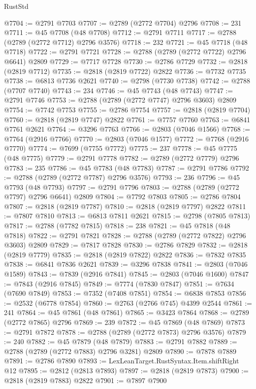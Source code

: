 \begin{lexlean}{RustStd}
\begin{coremodule}
@7704 := @2791 @7703
@7707 := @2789 (@2772 @7704) @2796
@7708 := 231
@7711 := @45 @7708 (@48 @7708)
@7712 := @2791 @7711
@7717 := @2788 (@2789 (@2772 @7712) @2796 @3576)
@7718 := 232
@7721 := @45 @7718 (@48 @7718)
@7722 := @2791 @7721
@7728 := @2788 (@2789 (@2772 @7722) @2796 @6641) @2809
@7729 := @7717 @7728
@7730 := @2786 @7729
@7732 := @2818 (@2819 @7712)
@7735 := @2818 (@2819 @7722) @2822
@7736 := @7732 @7735
@7738 := @6813 @7736 @2621
@7740 := @2798 (@7730 @7738)
@7742 := @2788 (@7707 @7740)
@7743 := 234
@7746 := @45 @7743 (@48 @7743)
@7747 := @2791 @7746
@7753 := @2788 (@2789 (@2772 @7747) @2796 @3603) @2809
@7754 := @7742 @7753
@7755 := @2786 @7754
@7757 := @2818 (@2819 @7704)
@7760 := @2818 (@2819 @7747) @2822
@7761 := @7757 @7760
@7763 := @6841 @7761 @2621
@7764 := @3296 @7763
@7766 := @2803 (@7046 @1566)
@7768 := @7764 (@2916 @7766)
@7770 := @2803 (@7046 @1577)
@7772 := @7768 (@2916 @7770)
@7774 := @7699 (@7755 @7772)
@7775 := 237
@7778 := @45 @7775 (@48 @7775)
@7779 := @2791 @7778
@7782 := @2789 (@2772 @7779) @2796
@7783 := 235
@7786 := @45 @7783 (@48 @7783)
@7787 := @2791 @7786
@7792 := @2788 (@2789 (@2772 @7787) @2796 @3576)
@7793 := 236
@7796 := @45 @7793 (@48 @7793)
@7797 := @2791 @7796
@7803 := @2788 (@2789 (@2772 @7797) @2796 @6641) @2809
@7804 := @7792 @7803
@7805 := @2786 @7804
@7807 := @2818 (@2819 @7787)
@7810 := @2818 (@2819 @7797) @2822
@7811 := @7807 @7810
@7813 := @6813 @7811 @2621
@7815 := @2798 (@7805 @7813)
@7817 := @2788 (@7782 @7815)
@7818 := 238
@7821 := @45 @7818 (@48 @7818)
@7822 := @2791 @7821
@7828 := @2788 (@2789 (@2772 @7822) @2796 @3603) @2809
@7829 := @7817 @7828
@7830 := @2786 @7829
@7832 := @2818 (@2819 @7779)
@7835 := @2818 (@2819 @7822) @2822
@7836 := @7832 @7835
@7838 := @6841 @7836 @2621
@7839 := @3296 @7838
@7841 := @2803 (@7046 @1589)
@7843 := @7839 (@2916 @7841)
@7845 := @2803 (@7046 @1600)
@7847 := @7843 (@2916 @7845)
@7849 := @7774 (@7830 @7847)
@7851 := @7634 (@7690 @7849)
@7853 := @7352 (@7408 @7851)
@7854 := @6838 @7853
@7856 := @2532 (@6778 @7854)
@7860 := @2763 (@2766 @745) @4399 @2544
@7861 := 241
@7864 := @45 @7861 (@48 @7861)
@7865 := @3423 @7864
@7868 := @2789 (@2772 @7865) @2796
@7869 := 239
@7872 := @45 @7869 (@48 @7869)
@7873 := @2791 @7872
@7878 := @2788 (@2789 (@2772 @7873) @2796 @3576)
@7879 := 240
@7882 := @45 @7879 (@48 @7879)
@7883 := @2791 @7882
@7889 := @2788 (@2789 (@2772 @7883) @2796 @3281) @2809
@7890 := @7878 @7889
@7891 := @2786 @7890
@7893 := LexLeanTarget.RustSyntax.Item.shiftRight @12
@7895 := @2812 (@2813 @7893)
@7897 := @2818 (@2819 @7873)
@7900 := @2818 (@2819 @7883) @2822
@7901 := @7897 @7900

\end{coremodule}
\end{lexlean}
